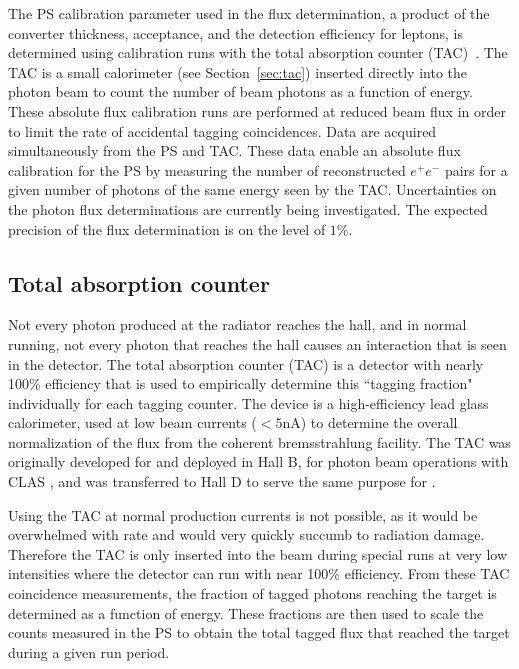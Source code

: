 The PS calibration parameter used in the flux determination, a product
of the  converter thickness, acceptance, and the detection efficiency
for leptons, is determined using calibration runs with the total 
absorption counter (TAC)~\cite{somov_flux}. The TAC is a small calorimeter
(see Section~\ref{sec:tac}) inserted directly into the photon
beam to count the number of beam photons as a function of energy.
These absolute flux calibration runs are performed at reduced beam flux in
order to limit the rate of accidental tagging coincidences.
Data are acquired simultaneously from the PS and TAC.
These data enable an absolute flux calibration for the PS
by measuring the number of reconstructed $e^+e^-$ pairs for a given
number of photons of the same energy seen by the TAC. 
Uncertainties on the photon flux determinations are currently being
investigated. The expected precision of the flux determination is on
the level of $1\%$.

\subsection{Total absorption counter \label{sec:tac}}
Not every photon produced at the radiator reaches the hall, and in
normal \GX{} running, not every photon that reaches the hall causes
an interaction that is seen in the \GX{} detector.
The total absorption counter (TAC) is a
detector with nearly 100\% efficiency that is used to empirically
determine this ``tagging fraction" individually for each tagging counter.
The device is a high-efficiency lead glass
calorimeter, used at low beam currents ($<5$nA) to determine the overall
normalization of the flux from the \GX{} coherent bremsstrahlung facility.
The TAC was originally developed for and deployed in Hall B, for
photon beam operations with CLAS
\cite{clasnote1992014, clasnote1993011,clasnote1999002},
and was transferred to Hall D to serve the same purpose for \GX{}.

Using the TAC at normal \GX{} production currents is not possible,
as it would be overwhelmed with rate and would very quickly succumb
to radiation damage. Therefore the TAC is only inserted into the
beam during special runs at very low intensities where the detector can run
with near 100\% efficiency.
From these TAC coincidence measurements, the fraction of tagged photons
reaching the \GX{} target is determined as a function of energy.
These fractions are then used to scale the counts measured in the
PS to obtain the total tagged flux that reached the \GX{} target during
a given run period.



